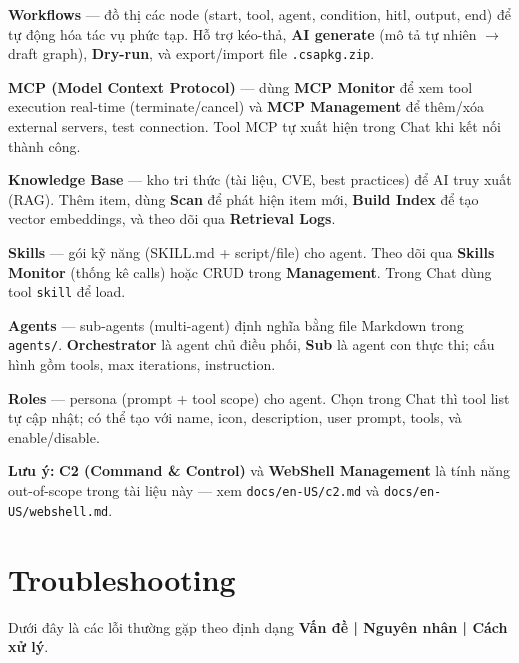\documentclass[11pt,a4paper]{article}
\newcommand{\ccode}[1]{\texttt{\small #1}}
\begin{document}
\textbf{Workflows} — đồ thị các node (start, tool, agent, condition, hitl, output, end) để tự động hóa tác vụ phức tạp. Hỗ trợ kéo-thả, \textbf{AI generate} (mô tả tự nhiên $\rightarrow$ draft graph), \textbf{Dry-run}, và export/import file \ccode{.csapkg.zip}.

\textbf{MCP (Model Context Protocol)} — dùng \textbf{MCP Monitor} để xem tool execution real-time (terminate/cancel) và \textbf{MCP Management} để thêm/xóa external servers, test connection. Tool MCP tự xuất hiện trong Chat khi kết nối thành công.

\textbf{Knowledge Base} — kho tri thức (tài liệu, CVE, best practices) để AI truy xuất (RAG). Thêm item, dùng \textbf{Scan} để phát hiện item mới, \textbf{Build Index} để tạo vector embeddings, và theo dõi qua \textbf{Retrieval Logs}.

\textbf{Skills} — gói kỹ năng (SKILL.md + script/file) cho agent. Theo dõi qua \textbf{Skills Monitor} (thống kê calls) hoặc CRUD trong \textbf{Management}. Trong Chat dùng tool \ccode{skill} để load.

\textbf{Agents} — sub-agents (multi-agent) định nghĩa bằng file Markdown trong \ccode{agents/}. \textbf{Orchestrator} là agent chủ điều phối, \textbf{Sub} là agent con thực thi; cấu hình gồm tools, max iterations, instruction.

\textbf{Roles} — persona (prompt + tool scope) cho agent. Chọn trong Chat thì tool list tự cập nhật; có thể tạo với name, icon, description, user prompt, tools, và enable/disable.

\textbf{Lưu ý:} \textbf{C2 (Command \& Control)} và \textbf{WebShell Management} là tính năng out-of-scope trong tài liệu này --- xem \ccode{docs/en-US/c2.md} và \ccode{docs/en-US/webshell.md}.

\section{Troubleshooting}

Dưới đây là các lỗi thường gặp theo định dạng \textbf{Vấn đề | Nguyên nhân | Cách xử lý}.
\end{document}
